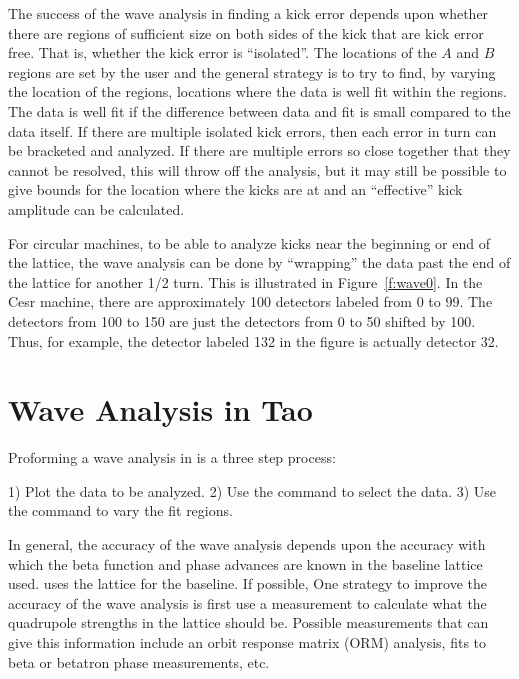The success of the wave analysis in finding a kick error depends upon
whether there are regions of sufficient size on both sides of the kick
that are kick error free. That is, whether the kick error is
``isolated''. The locations of the $A$ and $B$ regions are set by the
user and the general strategy is to try to find, by varying the
location of the regions, locations where the data is well fit within
the regions. The data is well fit if the difference between data and
fit is small compared to the data itself. If there are multiple
isolated kick errors, then each error in turn can be bracketed and
analyzed. If there are multiple errors so close together that they
cannot be resolved, this will throw off the analysis, but it may still
be possible to give bounds for the location where the kicks are at and
an ``effective'' kick amplitude can be calculated.

For circular machines, to be able to analyze kicks near the beginning
or end of the lattice, the wave analysis can be done by ``wrapping''
the data past the end of the lattice for another 1/2 turn. This is
illustrated in Figure~\ref{f:wave0}. In the Cesr machine, there are
approximately 100 detectors labeled from 0 to 99.  The detectors from
100 to 150 are just the detectors from 0 to 50 shifted by 100. Thus,
for example, the detector labeled 132 in the figure is actually
detector 32.

\section{Wave Analysis in Tao}
\label{s:wave.tao}

Proforming a wave analysis in \tao is a three step process:
\begin{example}
  1) Plot the data to be analyzed.
  2) Use the  command to select the data.
  3) Use the  command to vary the fit regions.
\end{example}

In general, the accuracy of the wave analysis depends upon the
accuracy with which the beta function and phase advances are known in
the baseline lattice used. \tao uses the  lattice for the
baseline. If possible, One strategy to improve the accuracy of the
wave analysis is first use a measurement to calculate what the
quadrupole strengths in the  lattice should be. Possible
measurements that can give this information include an orbit response
matrix (ORM) analysis, fits to beta or betatron phase measurements, etc.

